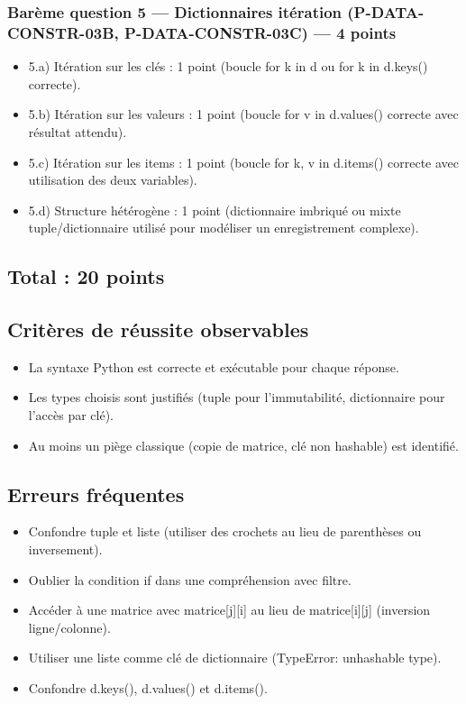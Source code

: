 \subsubsection{Barème question 5 — Dictionnaires itération (P-DATA-CONSTR-03B, P-DATA-CONSTR-03C) — 4 points}

\begin{itemize}
\tightlist
\item
  5.a) Itération sur les clés : 1 point (boucle for k in d ou for k in
  d.keys() correcte).
\item
  5.b) Itération sur les valeurs : 1 point (boucle for v in d.values()
  correcte avec résultat attendu).
\item
  5.c) Itération sur les items : 1 point (boucle for k, v in d.items()
  correcte avec utilisation des deux variables).
\item
  5.d) Structure hétérogène : 1 point (dictionnaire imbriqué ou mixte
  tuple/dictionnaire utilisé pour modéliser un enregistrement complexe).
\end{itemize}

\subsection{Total : 20 points}

\subsection{Critères de réussite observables}

\begin{itemize}
\tightlist
\item
  La syntaxe Python est correcte et exécutable pour chaque réponse.
\item
  Les types choisis sont justifiés (tuple pour l'immutabilité,
  dictionnaire pour l'accès par clé).
\item
  Au moins un piège classique (copie de matrice, clé non hashable) est
  identifié.
\end{itemize}

\subsection{Erreurs fréquentes}

\begin{itemize}
\tightlist
\item
  Confondre tuple et liste (utiliser des crochets au lieu de parenthèses
  ou inversement).
\item
  Oublier la condition if dans une compréhension avec filtre.
\item
  Accéder à une matrice avec matrice{[}j{]}{[}i{]} au lieu de
  matrice{[}i{]}{[}j{]} (inversion ligne/colonne).
\item
  Utiliser une liste comme clé de dictionnaire (TypeError: unhashable
  type).
\item
  Confondre d.keys(), d.values() et d.items().
\end{itemize}


